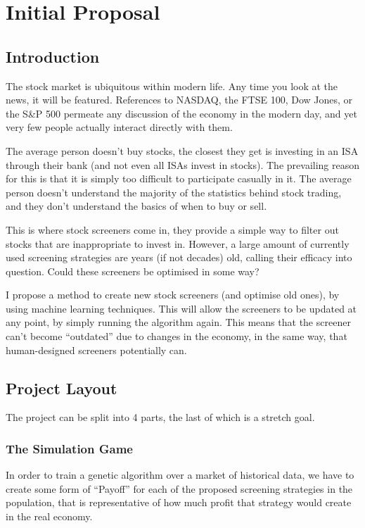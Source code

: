 \section{Initial Proposal}
\subsection{Introduction}
The stock market is ubiquitous within modern life. Any time you look at the news, it will be featured. References to NASDAQ, the FTSE 100, Dow Jones, or the S\&P 500 permeate any discussion of the economy in the modern day, and yet very few people actually interact directly with them. \newline

The average person doesn’t buy stocks, the closest they get is investing in an ISA through their bank (and not even all ISAs invest in stocks). The prevailing reason for this is that it is simply too difficult to participate casually in it. The average person doesn’t understand the majority of the statistics behind stock trading, and they don't understand the basics of when to buy or sell. \newline

This is where stock screeners come in, they provide a simple way to filter out stocks that are inappropriate to invest in. However, a large amount of currently used screening strategies are years (if not decades) old, calling their efficacy into question. Could these screeners be optimised in some way? \newline

I propose a method to create new stock screeners (and optimise old ones), by using machine learning techniques. This will allow the screeners to be updated at any point, by simply running the algorithm again. This means that the screener can’t become “outdated” due to changes in the economy, in the same way, that human-designed screeners potentially can.

\subsection{Project Layout}
The project can be split into 4 parts, the last of which is a stretch goal.

\subsubsection{The Simulation Game}
In order to train a genetic algorithm over a market of historical data, we have to create some form of “Payoff” for each of the proposed screening strategies in the population, that is representative of how much profit that strategy would create in the real economy. \newline

